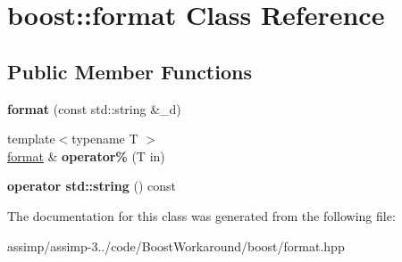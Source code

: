 \hypertarget{classboost_1_1format}{\section{boost\+:\+:format Class Reference}
\label{classboost_1_1format}
}
\subsection*{Public Member Functions}
\begin{DoxyCompactItemize}
\item 
\hypertarget{classboost_1_1format_ac3e2fe8e8c5de36a043e15e9182a9fe8}{{\bfseries format} (const std\+::string \&\+\_\+d)}\label{classboost_1_1format_ac3e2fe8e8c5de36a043e15e9182a9fe8}

\item 
\hypertarget{classboost_1_1format_ad8de54501dfce5d321e14fef08fe3647}{{\footnotesize template$<$typename T $>$ }\\\hyperlink{classboost_1_1format}{format} \& {\bfseries operator\%} (T in)}\label{classboost_1_1format_ad8de54501dfce5d321e14fef08fe3647}

\item 
\hypertarget{classboost_1_1format_a8522f2c9259fb4ad378a8a8999149eb3}{{\bfseries operator std\+::string} () const }\label{classboost_1_1format_a8522f2c9259fb4ad378a8a8999149eb3}

\end{DoxyCompactItemize}


The documentation for this class was generated from the following file\+:\begin{DoxyCompactItemize}
\item 
assimp/assimp-\/3../code/\+Boost\+Workaround/boost/format.\+hpp\end{DoxyCompactItemize}
